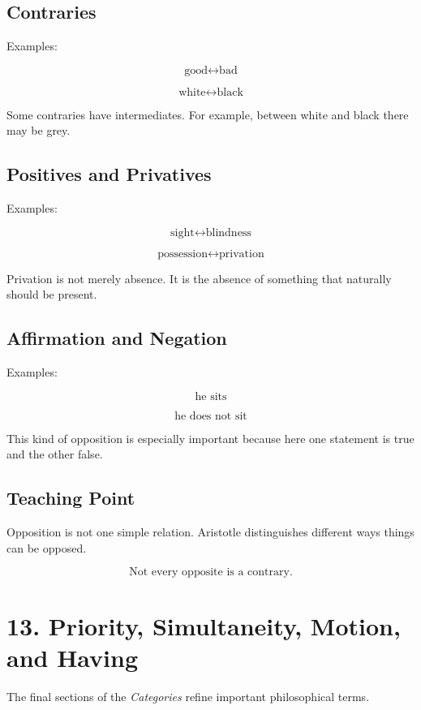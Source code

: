 \documentclass[12pt]{article}
\begin{document}
\subsection*{Contraries}

Examples:

\[
\text{good} \leftrightarrow \text{bad}
\]

\[
\text{white} \leftrightarrow \text{black}
\]

Some contraries have intermediates. For example, between white and black there
may be grey.

\subsection*{Positives and Privatives}

Examples:

\[
\text{sight} \leftrightarrow \text{blindness}
\]

\[
\text{possession} \leftrightarrow \text{privation}
\]

Privation is not merely absence. It is the absence of something that naturally
should be present.

\subsection*{Affirmation and Negation}

Examples:

\[
\text{he sits}
\]

\[
\text{he does not sit}
\]

This kind of opposition is especially important because here one statement is
true and the other false.

\subsection*{Teaching Point}

Opposition is not one simple relation. Aristotle distinguishes different ways
things can be opposed.

\[
\boxed{
\text{Not every opposite is a contrary.}
}
\]

\section*{13. Priority, Simultaneity, Motion, and Having}

The final sections of the \textit{Categories} refine important philosophical
terms.
\end{document}
